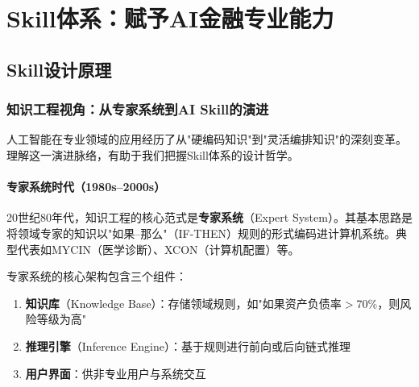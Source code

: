 
\chapter{Skill体系：赋予AI金融专业能力}

\section{Skill设计原理}

\subsection{知识工程视角：从专家系统到AI Skill的演进}

人工智能在专业领域的应用经历了从"硬编码知识"到"灵活编排知识"的深刻变革。理解这一演进脉络，有助于我们把握Skill体系的设计哲学。

\subsubsection{专家系统时代（1980s--2000s）}

20世纪80年代，知识工程的核心范式是\textbf{专家系统}（Expert System）。其基本思路是将领域专家的知识以"如果--那么"（IF-THEN）规则的形式编码进计算机系统。典型代表如MYCIN（医学诊断）、XCON（计算机配置）等。

专家系统的核心架构包含三个组件：
\begin{enumerate}[leftmargin=2em]
  \item \textbf{知识库}（Knowledge Base）：存储领域规则，如"如果资产负债率$>$70\%，则风险等级为高"
  \item \textbf{推理引擎}（Inference Engine）：基于规则进行前向或后向链式推理
  \item \textbf{用户界面}：供非专业用户与系统交互
\end{enumerate}

